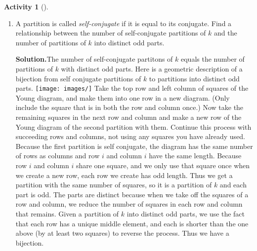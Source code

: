 \documentclass[10pt,]{book}
\theoremstyle{plain}
\theoremstyle{definition}
\newtheorem{activity}[project]{Activity}
\numberwithin{equation}{chapter}
\begin{document}
\begin{activity}[]\label{activity-54}
~\par
\begin{enumerate}[label=(\alph*)]
 \item A partition is called \emph{self-conjugate} if it is equal to its conjugate. Find a relationship between the number of self-conjugate partitions of \(k\) and the number of partitions of \(k\) into distinct odd parts.%
\par\medskip\noindent%
\textbf{Solution.}\quad The number of self-conjugate partitons of \(k\) equals the number of partitions of \(k\) with distinct odd parts. Here is a geometric description of a bijection from self conjugate partitions of \(k\) to partitions into distinct odd parts. \texttt{[image: images/]}
 Take the top row and left column of squares of the Young diagram, and make them into one row in a new diagram. (Only include the square that is in both the row and column once.) Now take the remaining squares in the next row and column and make a new row of the Young diagram of the second partition with them. Continue this process with succeeding rows and columns, not using any squares you have already used. Because the first partition is self conjugate, the diagram has the same number of rows as columns and row \(i\) and column \(i\) have the same length. Because row \(i\) and column \(i\) share one square, and we only use that square once when we create a new row, each row we create has odd length. Thus we get a partition with the same number of squares, so it is a partition of \(k\) and each part is odd. The parts are distinct because when we take off the squares of a row and column, we reduce the number of squares in each row and column that remains. Given a partition of \(k\) into distinct odd parts, we use the fact that each row has a unique middle element, and each is shorter than the one above (by at least two squares) to reverse the process. Thus we have a bijection.%


\end{enumerate}
\end{activity}
\end{document}
